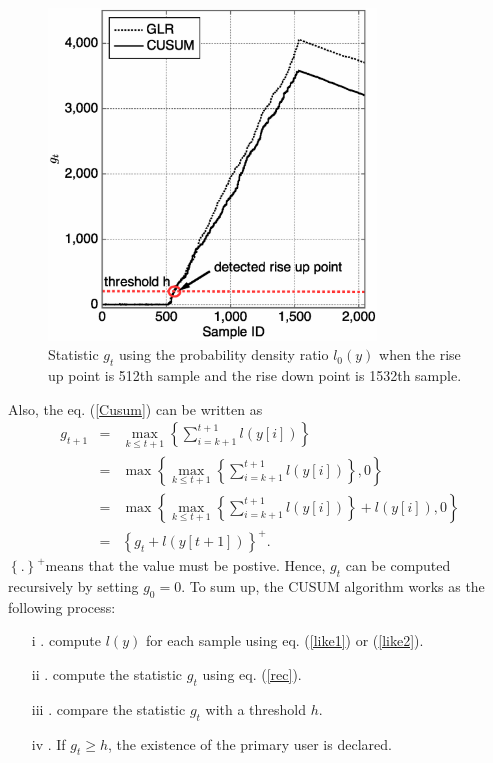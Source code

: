 \begin{figure}[t]
\centering
\includegraphics[width=87mm]{OFF2ON.eps}
\caption{ Statistic $g_t$ using the probability density ratio $l_0(y)$  when the rise up point is 512th sample and the rise down point is 1532th sample.}
\label{OFF2ON}
\end{figure}

Also, the eq. (\ref{Cusum}) can be written as
\begin{eqnarray}
g_{t+1} &=& \max_{k \leq t+1}\left\{\sum_{i=k+1}^{t+1}l(y[i])\right\} \nonumber \\ 
&=& \max\left\{\max_{k \leq t+1}\left\{\sum_{i=k+1}^{t+1}l(y[i])\right\},0\right\} \nonumber \\
&=& \max\left\{\max_{k \leq t+1}\left\{\sum_{i=k+1}^{t+1}l(y[i])\right\}+l(y[i]),0\right\} \nonumber \\
&=& \left\{g_t+l(y[t+1])\right\}^{+}.
\label{rec}
\end{eqnarray}
$\left\{.\right\}^{+}$means that the value must be postive. Hence, $g_t$ can be computed recursively by setting $g_0=0$. To sum up, the CUSUM algorithm works as the following process:
\begin{enumerate}
  \item[i]. compute $l(y)$ for each sample using eq. (\ref{like1}) or (\ref{like2}).
  \item[ii]. compute the statistic $g_t$ using eq. (\ref{rec}).
  \item[iii]. compare the statistic $g_t$ with a threshold $h$.
  \item[iv]. If $g_t \geq h$, the existence of the primary user is declared.
\end{enumerate}

